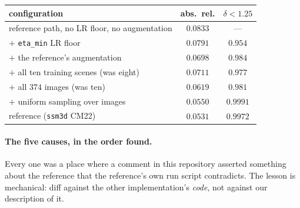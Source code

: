 \documentclass[11pt,a4paper]{article}
\begin{document}
\begin{center}
\begin{tabular}{lcc}
\toprule
configuration & abs.\ rel. & $\delta{<}1.25$ \\
\midrule
reference path, no LR floor, no augmentation & $0.0833$ & --- \\
$+$ \texttt{eta\_min} LR floor                & $0.0791$ & $0.954$ \\
$+$ the reference's augmentation              & $0.0698$ & $0.984$ \\
$+$ all ten training scenes (was eight)       & $0.0711$ & $0.977$ \\
$+$ all $374$ images (was ten)                & $0.0619$ & $0.981$ \\
$+$ uniform sampling over images              & $\mathbf{0.0550}$ & $\mathbf{0.9991}$ \\
\midrule
reference (\texttt{ssm3d} CM22)               & $0.0531$ & $0.9972$ \\
\bottomrule
\end{tabular}
\end{center}

\paragraph{The five causes, in the order found.} Every one was a place where a comment in this
repository asserted something about the reference that the reference's own run script contradicts.
The lesson is mechanical: diff against the other implementation's \emph{code}, not against our
description of it.
\end{document}
